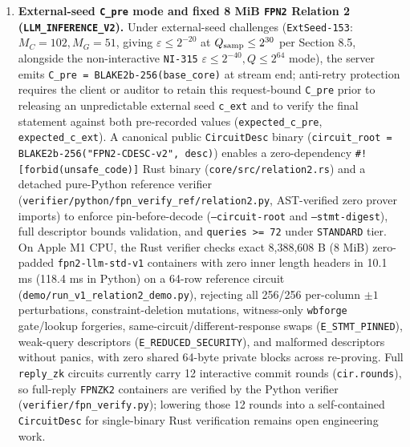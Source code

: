 \documentclass[10pt]{article}
\begin{document}
\begin{enumerate}
\item{} \textbf{External-seed \texttt{C\_\allowbreak{}pre} mode and fixed 8 MiB \texttt{FPN2} Relation 2 (\texttt{LLM\_\allowbreak{}INFERENCE\_\allowbreak{}V2}).} Under external-seed challenges (\texttt{ExtSeed-153}: $M_C = 102, M_G = 51$, giving $\varepsilon \le 2^{-20}$ at $Q_{\rm samp}\le 2^{30}$ per Section 8.5, alongside the non-interactive \texttt{NI-315} $\varepsilon \le 2^{-40}, Q \le 2^{64}$ mode), the server emits \texttt{C\_\allowbreak{}pre = BLAKE2b-256(base\_\allowbreak{}core)} at stream end; anti-retry protection requires the client or auditor to retain this request-bound \texttt{C\_\allowbreak{}pre} prior to releasing an unpredictable external seed \texttt{c\_\allowbreak{}ext} and to verify the final statement against both pre-recorded values (\texttt{expected\_\allowbreak{}c\_\allowbreak{}pre}, \texttt{expected\_\allowbreak{}c\_\allowbreak{}ext}). A canonical public \texttt{CircuitDesc} binary (\texttt{circuit\_\allowbreak{}root = BLAKE2b-256("FPN2-CDESC-v2", desc)}) enables a zero-dependency \texttt{\#![forbid(unsafe\_\allowbreak{}code)]} Rust binary (\texttt{core/src/relation2.\allowbreak{}rs}) and a detached pure-Python reference verifier (\texttt{verifier/python/fpn\_\allowbreak{}verify\_\allowbreak{}ref/relation2.\allowbreak{}py}, AST-verified zero prover imports) to enforce pin-before-decode (\texttt{--circuit-root} and \texttt{--stmt-digest}), full descriptor bounds validation, and \texttt{queries >= 72} under \texttt{STANDARD} tier. On Apple M1 CPU, the Rust verifier checks exact 8,388,608 B (8 MiB) zero-padded \texttt{fpn2-llm-std-v1} containers with zero inner length headers in 10.1 ms (118.4 ms in Python) on a 64-row reference circuit (\texttt{demo/run\_\allowbreak{}v1\_\allowbreak{}relation2\_\allowbreak{}demo.\allowbreak{}py}), rejecting all 256/256 per-column $\pm 1$ perturbations, constraint-deletion mutations, witness-only \texttt{wbforge} gate/lookup forgeries, same-circuit/different-response swaps (\texttt{E\_\allowbreak{}STMT\_\allowbreak{}PINNED}), weak-query descriptors (\texttt{E\_\allowbreak{}REDUCED\_\allowbreak{}SECURITY}), and malformed descriptors without panics, with zero shared 64-byte private blocks across re-proving. Full \texttt{reply\_\allowbreak{}zk} circuits currently carry 12 interactive commit rounds (\texttt{cir.\allowbreak{}rounds}), so full-reply \texttt{FPNZK2} containers are verified by the Python verifier (\texttt{verifier/fpn\_\allowbreak{}verify.\allowbreak{}py}); lowering those 12 rounds into a self-contained \texttt{CircuitDesc} for single-binary Rust verification remains open engineering work.
\end{enumerate}
\end{document}
